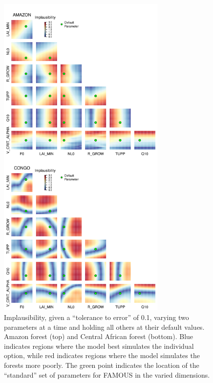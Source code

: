 \documentclass[esd, manuscript]{copernicus}
\begin{document}
\begin{figure}[t]
\includegraphics[width=8.3cm]{graphics/taat.png}
\caption{Implausibility, given a ``tolerance to error'' of 0.1, varying two parameters at a time and holding all others at their default values. Amazon forest (top) and Central African forest (bottom). Blue indicates regions where the model best simulates the individual option, while red indicates regions where the model simulates the forests more poorly. The green point indicates the location of the ``standard'' set of parameters for FAMOUS in the varied dimensions.}
\label{fig:taat}
\end{figure}
\end{document}
